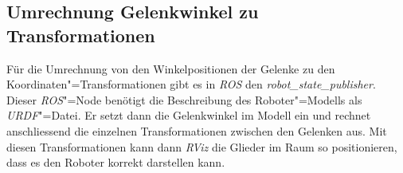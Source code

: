 \subsection{Umrechnung Gelenkwinkel zu Transformationen}
\label{chap:robot-state-publiseher}
Für die Umrechnung von den Winkelpositionen der Gelenke zu den Koordinaten"=Transformationen gibt es in \textit{ROS} den \textit{robot\_state\_publisher}.
Dieser \textit{ROS}"=Node benötigt die Beschreibung des Roboter"=Modells als \textit{URDF}"=Datei.
Er setzt dann die Gelenkwinkel im Modell ein und rechnet anschliessend die einzelnen Transformationen zwischen den Gelenken aus.
Mit diesen Transformationen kann dann \textit{RViz} die Glieder im Raum so positionieren, dass es den Roboter korrekt darstellen kann.







